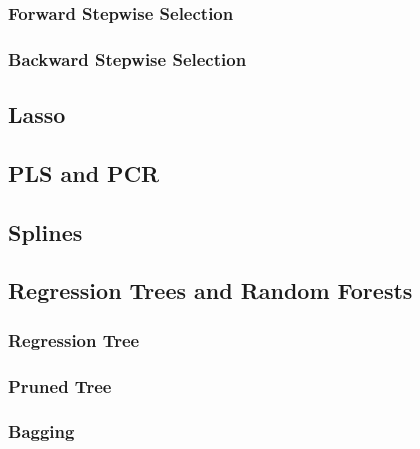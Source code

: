 \documentclass[11pt,]{article}
\begin{document}
\hypertarget{forward-stepwise-selection}{%
\subsubsection{Forward Stepwise
Selection}\label{forward-stepwise-selection}}

\hypertarget{backward-stepwise-selection}{%
\subsubsection{Backward Stepwise
Selection}\label{backward-stepwise-selection}}

\hypertarget{lasso}{%
\subsection{Lasso}\label{lasso}}

\hypertarget{pls-and-pcr}{%
\subsection{PLS and PCR}\label{pls-and-pcr}}

\hypertarget{splines}{%
\subsection{Splines}\label{splines}}

\hypertarget{regression-trees-and-random-forests}{%
\subsection{Regression Trees and Random
Forests}\label{regression-trees-and-random-forests}}

\hypertarget{regression-tree}{%
\subsubsection{Regression Tree}\label{regression-tree}}

\hypertarget{pruned-tree}{%
\subsubsection{Pruned Tree}\label{pruned-tree}}

\hypertarget{bagging}{%
\subsubsection{Bagging}\label{bagging}}
\end{document}
